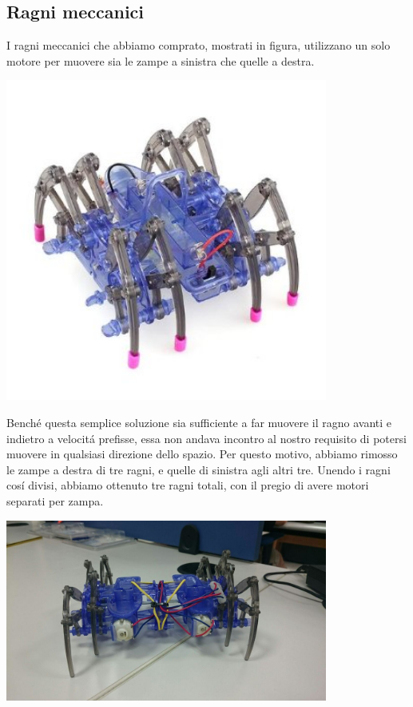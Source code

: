 \documentclass [11pt ,a4paper ,twoside ]{article}
\begin{document}
\subsection{Ragni meccanici}

I ragni meccanici che abbiamo comprato, mostrati in figura, utilizzano un solo motore per muovere sia le zampe a sinistra che quelle a destra. 
\begin{center}
\includegraphics[keepaspectratio, width=300pt]{Images/single_spider2.png}
\end{center}
Bench\'e questa semplice soluzione sia sufficiente a far muovere il ragno avanti e indietro a velocit\'a prefisse, essa non andava incontro al nostro requisito di potersi muovere in qualsiasi direzione dello spazio. Per questo motivo, abbiamo rimosso le zampe a destra di tre ragni, e quelle di sinistra agli altri tre. Unendo i ragni cos\'i divisi, abbiamo ottenuto tre ragni totali, con il pregio di avere motori separati per zampa.
\begin{center}
\includegraphics[keepaspectratio, width=300pt]{Images/double_spider.png}
\end{center}
\end{document}
